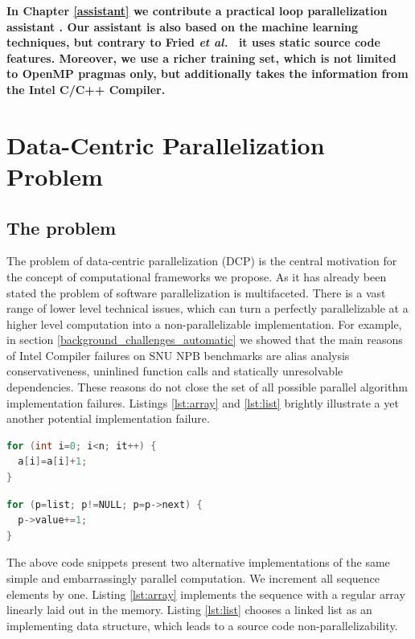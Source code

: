 \textbf{\quad In Chapter \ref{assistant} we contribute a practical loop parallelization assistant \cite{assistant-aiseps}. Our assistant is also based on the machine learning techniques, but contrary to Fried \emph{et al.}~\cite{fried_ea:2013:icmla} it uses static source code features. Moreover, we use a richer training set, which is not limited to OpenMP pragmas only, but additionally takes the information from the Intel C/C++ Compiler.}
\section{Data-Centric Parallelization Problem}
\label{background_dcp}
\subsection{The problem}
\label{background_dcp_problem}
\quad The problem of data-centric parallelization (DCP) is the central motivation for the concept of computational frameworks we propose. As it has already been stated the problem of software parallelization is multifaceted. There is a vast range of lower level technical issues, which can turn a perfectly parallelizable at a higher level computation into a non-parallelizable implementation. For example, in section \ref{background_challenges_automatic} we showed that the main reasons of Intel Compiler failures on SNU NPB benchmarks are alias analysis conservativeness, uninlined function calls and statically unresolvable dependencies. These reasons do not close the set of all possible parallel algorithm implementation failures. Listings \ref{lst:array} and \ref{lst:list} brightly illustrate a yet another potential implementation failure.\newline\null
\begin{minipage}[t]{0.45\linewidth}
\begin{lstlisting}[caption={Parallelisable loop operating on a \textbf{linear array}.},label={lst:array},language=C]
for (int i=0; i<n; it++) {
  a[i]=a[i]+1;
}
\end{lstlisting}
\end{minipage}
%
\begin{minipage}[t]{0.55\linewidth}
\begin{lstlisting}[caption={Non-parallelisable loop operating on a \textbf{linked-list}.},label={lst:list},language=C]
for (p=list; p!=NULL; p=p->next) {
  p->value+=1;
}
\end{lstlisting}
\end{minipage}
\quad The above code snippets present two alternative implementations of the same simple and embarrassingly parallel computation. We increment all sequence elements by one. Listing \ref{lst:array} implements the sequence with a regular array linearly laid out in the memory. Listing \ref{lst:list} chooses a linked list as an implementing data structure, which leads to a source code non-parallelizability.\newline\null

